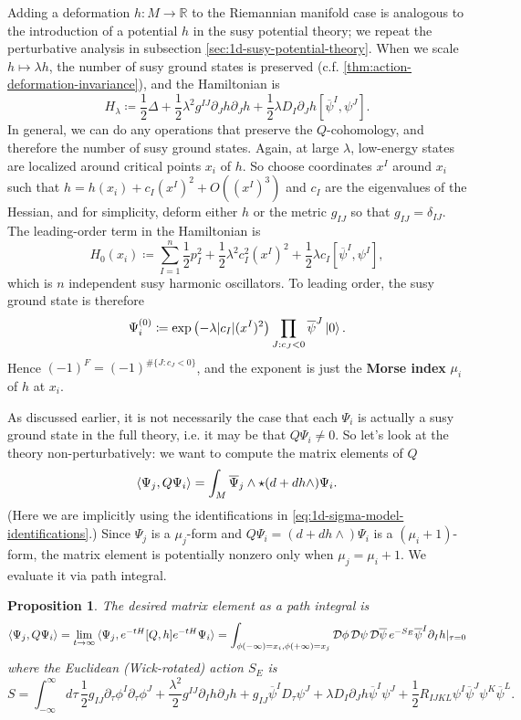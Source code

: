 \documentclass{report}
\theoremstyle{plain}
\newtheorem{proposition}[theorem]{Proposition}
\theoremstyle{definition}
\theoremstyle{remark}
\newcommand{\di}{\partial}
\newcommand{\bR}{\mathbb{R}}
\newcommand{\cD}{\mathcal{D}}
\newcommand{\cnj}{\overline}
\begin{document}
Adding a deformation $h\colon M \to \bR$ to the Riemannian manifold
case is analogous to the introduction of a potential $h$ in the susy
potential theory; we repeat the perturbative analysis in subsection
\ref{sec:1d-susy-potential-theory}. When we scale $h \mapsto \lambda
h$, the number of susy ground states is preserved (c.f.
\ref{thm:action-deformation-invariance}), and the Hamiltonian is
\[ H_\lambda \coloneqq \frac{1}{2} \Delta + \frac{1}{2} \lambda^2 g^{IJ} \di_J h \di_J h + \frac{1}{2} \lambda D_I \di_J h[\cnj\psi^I, \psi^J]. \]
In general, we can do any operations that preserve the $Q$-cohomology,
and therefore the number of susy ground states. Again, at large
$\lambda$, low-energy states are localized around critical points
$x_i$ of $h$. So choose coordinates $x^I$ around $x_i$ such that $h =
h(x_i) + c_I (x^I)^2 + O((x^I)^3)$ and $c_I$ are the eigenvalues of
the Hessian, and for simplicity, deform either $h$ or the metric
$g_{IJ}$ so that $g_{IJ} = \delta_{IJ}$. The leading-order term in the
Hamiltonian is
\[ H_0(x_i) \coloneqq \sum_{I=1}^n \frac{1}{2} p_I^2 + \frac{1}{2} \lambda^2 c_I^2 (x^I)^2 + \frac{1}{2} \lambda c_I [\cnj\psi^I, \psi^I], \]
which is $n$ independent susy harmonic oscillators. To leading order,
the susy ground state is therefore
\begin{equation} \label{eq:1d-critical-point-susy-ground-state}
  \Psi_i^{(0)} \coloneqq \exp\left(-\lambda |c_I| (x^I)^2\right) \prod_{J : c_J < 0} \cnj\psi^J \ket{0}.
\end{equation}
Hence $(-1)^F = (-1)^{\#\{J: c_J < 0\}}$, and the exponent is just the
{\bf Morse index} $\mu_i$ of $h$ at $x_i$.

As discussed earlier, it is not necessarily the case that each
$\Psi_i$ is actually a susy ground state in the full theory, i.e. it
may be that $Q \Psi_i \neq 0$. So let's look at the theory
non-perturbatively: we want to compute the matrix elements of $Q$
\[ \braket{\Psi_j, Q\Psi_i} = \int_M \cnj\Psi_j \wedge \star(d + dh \wedge) \Psi_i. \]
(Here we are implicitly using the identifications in
\eqref{eq:1d-sigma-model-identifications}.) Since $\Psi_j$ is a
$\mu_j$-form and $Q\Psi_i = (d + dh \wedge)\Psi_i$ is a
$(\mu_i+1)$-form, the matrix element is potentially nonzero only when
$\mu_j = \mu_i+1$. We evaluate it via path integral.

\begin{proposition}
  The desired matrix element as a path integral is
  \[ \braket{\Psi_j, Q\Psi_i} = \lim_{t \to \infty} \braket{\Psi_j, e^{-tH}[Q, h]e^{-tH}\Psi_i} = \int_{\phi(-\infty)=x_i, \phi(+\infty)=x_j} \cD\phi \, \cD\psi\, \cD\cnj\psi \, e^{-S_E} \cnj\psi^I \di_I h|_{\tau=0} \]
  where the Euclidean (Wick-rotated) action $S_E$ is
  \[ S = \int_{-\infty}^\infty d\tau \, \frac{1}{2} g_{IJ} \di_\tau \phi^I \di_\tau \phi^J + \frac{\lambda^2}{2} g^{IJ} \di_Ih \di_Jh + g_{IJ}\cnj\psi^I D_\tau \psi^J + \lambda D_I \di_J h \cnj\psi^I\psi^J + \frac{1}{2} R_{IJKL} \psi^I\cnj\psi^J\psi^K\cnj\psi^L. \]
\end{proposition}
\end{document}

